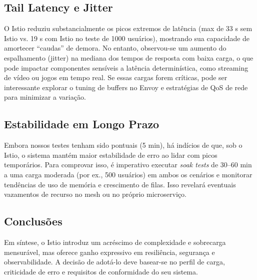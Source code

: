 \documentclass[12pt,a4paper]{report}
\begin{document}
\subsection{Tail Latency e Jitter}
O Istio reduziu substancialmente os picos extremos de latência (max de 33 s sem Istio vs. 19 s com Istio no teste de 1000 usuários), mostrando sua capacidade de amortecer “caudas” de demora. No entanto, observou-se um aumento do espalhamento (jitter) na mediana dos tempos de resposta com baixa carga, o que pode impactar componentes sensíveis a latência determinística, como streaming de vídeo ou jogos em tempo real. Se essas cargas forem críticas, pode ser interessante explorar o tuning de buffers no Envoy e estratégias de QoS de rede para minimizar a variação.

\subsection{Estabilidade em Longo Prazo}
Embora nossos testes tenham sido pontuais (5 min), há indícios de que, sob o Istio, o sistema mantém maior estabilidade de erro ao lidar com picos temporários. Para comprovar isso, é imperativo executar \textit{soak tests} de 30–60 min a uma carga moderada (por ex., 500 usuários) em ambos os cenários e monitorar tendências de uso de memória e crescimento de filas. Isso revelará eventuais vazamentos de recurso no mesh ou no próprio microserviço.

\subsection{Conclusões}

Em síntese, o Istio introduz um acréscimo de complexidade e sobrecarga mensurável, mas oferece ganho expressivo em resiliência, segurança e observabilidade. A decisão de adotá-lo deve basear-se no perfil de carga, criticidade de erro e requisitos de conformidade do seu sistema.

\end{document}
